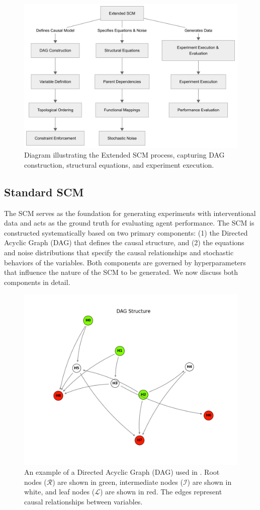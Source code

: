 \documentclass{article}
\begin{document}
        \begin{figure}[ht]
            \centering
            \includegraphics[width=0.7\columnwidth]{assets/scm_generation.png} %
            \caption{Diagram illustrating the Extended SCM process, capturing DAG construction, structural equations, and experiment execution.}
            \label{fig:scm_generation}
        \end{figure}



    \subsection{Standard SCM}
        The SCM serves as the foundation for generating experiments with interventional data and acts as the ground truth for evaluating agent performance. 
        The SCM is constructed systematically based on two primary components: 
        (1) the Directed Acyclic Graph (DAG) that defines the causal structure, and 
        (2) the equations and noise distributions that specify the causal relationships and stochastic behaviors of the variables.
        Both components are governed by hyperparameters that influence the nature of the SCM to be generated.
        We now discuss both components in detail.

        \begin{figure}[ht]
            \centering
            \includegraphics[width=0.7\columnwidth]{assets/dag_example.png} %
            \caption{An example of a Directed Acyclic Graph (DAG) used in \game. Root nodes ($\mathcal{R}$) are shown in green, intermediate nodes ($\mathcal{I}$) are shown in white, and leaf nodes ($\mathcal{L}$) are shown in red. The edges represent causal relationships between variables.}
            \label{fig:dag_example}
        \end{figure}
\end{document}
